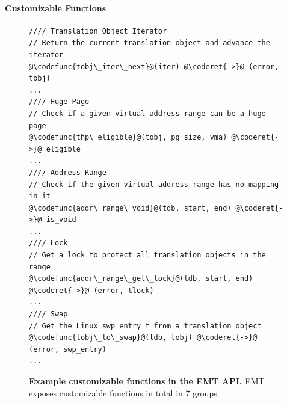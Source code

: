 \paragraph{Customizable Functions}
\label{emt:sec:design:opt}


\begin{figure}[H]
	\centering
\begin{singlespace}
\begin{verbatim}
//// Translation Object Iterator
// Return the current translation object and advance the iterator
@\codefunc{tobj\_iter\_next}@(iter) @\coderet{->}@ (error, tobj)
...
//// Huge Page
// Check if a given virtual address range can be a huge page
@\codefunc{thp\_eligible}@(tobj, pg_size, vma) @\coderet{->}@ eligible
...
//// Address Range
// Check if the given virtual address range has no mapping in it
@\codefunc{addr\_range\_void}@(tdb, start, end) @\coderet{->}@ is_void
...
//// Lock
// Get a lock to protect all translation objects in the range
@\codefunc{addr\_range\_get\_lock}@(tdb, start, end) @\coderet{->}@ (error, tlock)
...
//// Swap
// Get the Linux swp_entry_t from a translation object
@\codefunc{tobj\_to\_swap}@(tdb, tobj) @\coderet{->}@ (error, swp_entry)
...
\end{verbatim}
\end{singlespace}
\caption{{\bf Example customizable functions in the EMT API.}
	EMT exposes 
	 customizable functions in total in 7 groups.
}
\label{emt:fig:api-cus}
\end{figure}

